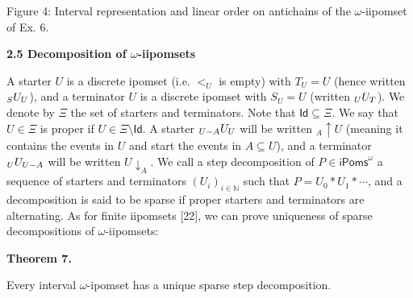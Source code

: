\documentclass[10pt,a4paper]{article}
\begin{document}
\begin{center}\end{center}
   
Figure 4: Interval representation and linear order on antichains of the $\omega$-iipomset of Ex. 6.\par
 
 
 
 
\par\medskip\noindent\textbf{2.5 Decomposition of $\omega$-iipomsets}\par
 
 
A starter $U$ is a discrete ipomset (i.e. $<_{U}$ is empty) with $T_{U}=U$ (hence written ${\vphantom{U}}_{S}U_{U}$), and a terminator $U$ is a discrete ipomset with $S_{U}=U$ (written ${\vphantom{U}}_{U}U_{T}$). We denote by $\Xi$ the set of starters and terminators. Note that $\mathsf{Id}\subseteq\Xi$. We say that $U\in\Xi$ is proper if $U\in\Xi\setminus\mathsf{Id}$. A starter ${\vphantom{U}}_{U-A}U_{U}$ will be written ${}_{A\!}{\uparrow}{U}$ (meaning it contains the events in $U$ and start the events in $A\subseteq U$), and a terminator ${\vphantom{U}}_{U}U_{U-A}$ will be written ${U}{\downarrow}_{A}$. We call a step decomposition of $P\in{\mathsf{iPoms}^{\omega}}$ a sequence of starters and terminators $(U_{i})_{i\in\mathbb{N}}$ such that $P=U_{0}*U_{1}*\cdots$, and a decomposition is said to be sparse if proper starters and terminators are alternating. As for finite iipomsets [22], we can prove uniqueness of sparse decompositions of $\omega$-iipomsets:\par
 
 
 
\par\medskip\noindent\textbf{Theorem 7.}\par
 
 
Every interval $\omega$-ipomset has a unique sparse step decomposition.\par
 
\end{document}
